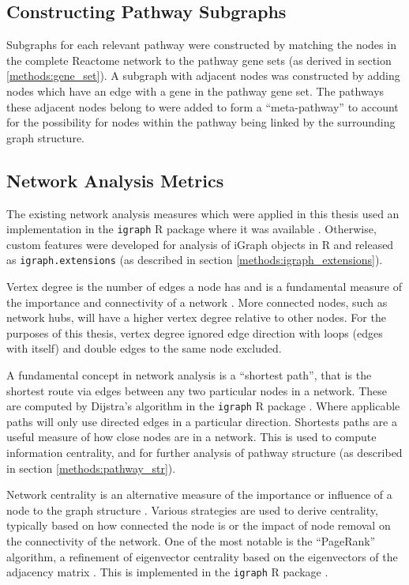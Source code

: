 \subsection{Constructing Pathway Subgraphs} \label{methods:subgraphs}
Subgraphs for each relevant pathway were constructed by matching the nodes in the complete Reactome network to the pathway gene sets (as derived in section \ref{methods:gene_set}). A subgraph with adjacent nodes was constructed by adding nodes which have an edge with a gene in the pathway gene set. The pathways these adjacent nodes belong to were added to form a ``meta-pathway'' to account for the possibility for nodes within the pathway being linked by the surrounding graph structure.

\subsection{Network Analysis Metrics} \label{methods:network_metrics}
The existing network analysis measures which were applied in this thesis used an implementation in the \texttt{igraph} R package where it was available \citep{igraph}. Otherwise, custom features were developed for analysis of iGraph objects in R and released as \texttt{igraph.extensions} (as described in section \ref{methods:igraph_extensions}).

Vertex degree is the number of edges a node has and is a fundamental measure of the importance and connectivity of a network \citep{vanSteen2010}. More connected nodes, such as network hubs, will have a higher vertex degree relative to other nodes. For the purposes of this thesis, vertex degree ignored edge direction with loops (edges with itself) and double edges to the same node excluded.

A fundamental concept in network analysis is a ``shortest path'', that is the shortest route via edges between any two particular nodes in a network. These are computed by Dijstra's algorithm \citep{Dijkstra1959} in the \texttt{igraph} R package \citep{igraph}. Where applicable paths will only use directed edges in a particular direction. Shortests paths are a useful measure of how close nodes are in a network. This is used to compute information centrality, and for further analysis of pathway structure (as described in section \ref{methods:pathway_str}).

Network centrality is an alternative measure of the importance or influence of a node to the graph structure \citep{Borgatti2005}. Various strategies are used to derive centrality,  typically based on how connected the node is or the impact of node removal on the connectivity of the network. One of the most notable is the ``PageRank'' algorithm, a refinement of eigenvector centrality based on the eigenvectors of the adjacency matrix \citep{Brin1998}. This is implemented in the \texttt{igraph} R package \citep{igraph}.

